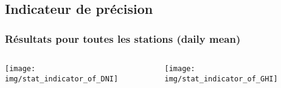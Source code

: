 \documentclass[8pt]{beamer}
\begin{document}
\subsection{Indicateur de précision}
\begin{frame}
	\frametitle{Résultats pour toutes les stations (daily mean)}
	\begin{columns}[T] %
		\begin{column}{0.49\linewidth} %
			\centering
			\texttt{[image: img/stat\_indicator\_of\_DNI]}
		\end{column}
		\begin{column}{0.49\linewidth} %
			\centering
			\texttt{[image: img/stat\_indicator\_of\_GHI]}
		\end{column}
	\end{columns}
\end{frame}
\end{document}
